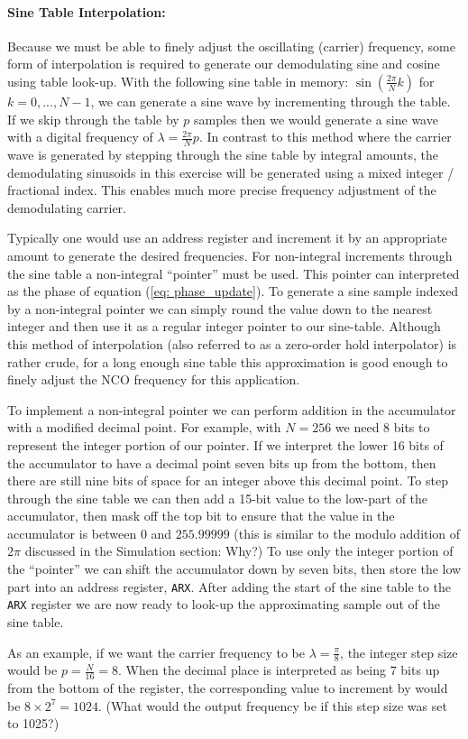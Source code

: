 
%
%
%
%
%

\paragraph{Sine Table Interpolation:}

Because
we must be able to finely adjust the oscillating (carrier) frequency,
some form of interpolation is required to generate our
demodulating sine and cosine using table look-up.
With the following sine table in memory: $\sin(\frac{2\pi}{N}k)$
for $k=0, ..., N-1$, we can generate a sine wave by incrementing
through the table.  If we skip through the table by $p$ samples
then we would generate a sine wave with a digital frequency of
$\lambda = \frac{2 \pi}{N} p$. 
In contrast to this method where the carrier
wave is generated by stepping through the sine
table by integral amounts, the demodulating sinusoids
in this exercise will be generated
using a mixed integer / fractional index.
This enables much more precise frequency adjustment of the demodulating
carrier. 


Typically one would use an address register and increment it by
an appropriate amount to generate the desired frequencies.  For
non-integral increments through the sine table a non-integral
``pointer'' must be used.  This pointer can interpreted as the phase
of equation (\ref{eq: phase_update}). To generate a sine sample indexed
by a non-integral pointer we can simply round the value
down to the nearest integer and then use it as a regular integer
pointer to our sine-table. 
Although this method of interpolation (also referred to
as a zero-order hold interpolator) is rather crude, for a
long enough sine table this approximation is good enough to 
finely adjust the NCO frequency for this application. 

To implement a non-integral pointer we can perform addition
in the accumulator with a modified decimal point.  For
example, with $N=256$ we need 8 bits to represent the
integer portion of our pointer.  If we interpret the 
lower 16 bits of the accumulator
to have a decimal point seven bits up
from the bottom, then there are still nine bits of space for 
an integer above this decimal point.
To step through the sine table we
can then add a 15-bit value to the low-part of the
accumulator, then mask off the top bit to ensure that
the value in the accumulator is between $0$ and $255.99999$
(this is similar to the modulo addition of $2 \pi$ discussed
in the \matlab Simulation section:  Why?)
To use only the integer portion of the ``pointer'' we
can shift the accumulator down by seven bits, then store
the low part into an address register, \verb+ARX+.  After adding the
start of the sine table to the \verb+ARX+ register we are now 
ready to look-up the approximating sample out of the sine table.
 
As an example, if we want the carrier frequency to be
$\lambda = \frac{\pi}{8}$, the integer step size 
would be $p=\frac{N}{16} = 8$.  When the decimal
place is interpreted as being 7 bits up from the 
bottom of the register, the corresponding value
to increment by would be $8 \times 2^7 = 1024$. 
(What would the output frequency be if this step size was
set to 1025?)
